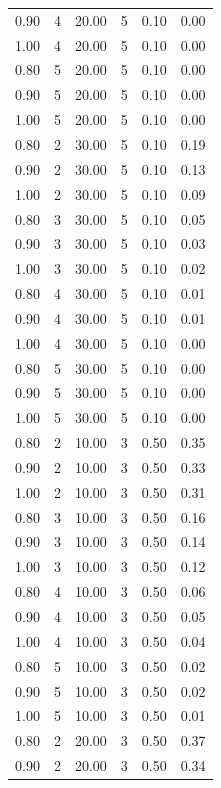 \documentclass[12pt]{article}
\begin{document}
{\begin{longtable}{cccccc}
  0.90 &   4 & 20.00 &   5 & 0.10 & 0.00 \\ 
  1.00 &   4 & 20.00 &   5 & 0.10 & 0.00 \\ 
  0.80 &   5 & 20.00 &   5 & 0.10 & 0.00 \\ 
  0.90 &   5 & 20.00 &   5 & 0.10 & 0.00 \\ 
  1.00 &   5 & 20.00 &   5 & 0.10 & 0.00 \\ 
  0.80 &   2 & 30.00 &   5 & 0.10 & 0.19 \\ 
  0.90 &   2 & 30.00 &   5 & 0.10 & 0.13 \\ 
  1.00 &   2 & 30.00 &   5 & 0.10 & 0.09 \\ 
  0.80 &   3 & 30.00 &   5 & 0.10 & 0.05 \\ 
  0.90 &   3 & 30.00 &   5 & 0.10 & 0.03 \\ 
  1.00 &   3 & 30.00 &   5 & 0.10 & 0.02 \\ 
  0.80 &   4 & 30.00 &   5 & 0.10 & 0.01 \\ 
  0.90 &   4 & 30.00 &   5 & 0.10 & 0.01 \\ 
  1.00 &   4 & 30.00 &   5 & 0.10 & 0.00 \\ 
  0.80 &   5 & 30.00 &   5 & 0.10 & 0.00 \\ 
  0.90 &   5 & 30.00 &   5 & 0.10 & 0.00 \\ 
  1.00 &   5 & 30.00 &   5 & 0.10 & 0.00 \\ 
  0.80 &   2 & 10.00 &   3 & 0.50 & 0.35 \\ 
  0.90 &   2 & 10.00 &   3 & 0.50 & 0.33 \\ 
  1.00 &   2 & 10.00 &   3 & 0.50 & 0.31 \\ 
  0.80 &   3 & 10.00 &   3 & 0.50 & 0.16 \\ 
  0.90 &   3 & 10.00 &   3 & 0.50 & 0.14 \\ 
  1.00 &   3 & 10.00 &   3 & 0.50 & 0.12 \\ 
  0.80 &   4 & 10.00 &   3 & 0.50 & 0.06 \\ 
  0.90 &   4 & 10.00 &   3 & 0.50 & 0.05 \\ 
  1.00 &   4 & 10.00 &   3 & 0.50 & 0.04 \\ 
  0.80 &   5 & 10.00 &   3 & 0.50 & 0.02 \\ 
  0.90 &   5 & 10.00 &   3 & 0.50 & 0.02 \\ 
  1.00 &   5 & 10.00 &   3 & 0.50 & 0.01 \\ 
  0.80 &   2 & 20.00 &   3 & 0.50 & 0.37 \\ 
  0.90 &   2 & 20.00 &   3 & 0.50 & 0.34 \\ 

\end{longtable}}
\end{document}

